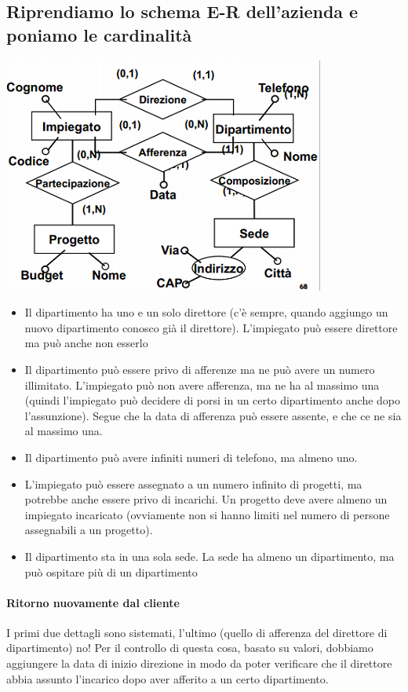 \subsection{Riprendiamo lo schema E-R dell'azienda e poniamo le cardinalità}
\begin{center}\includegraphics{images/18.PNG}\end{center}
\begin{itemize}
	\item Il dipartimento ha uno e un solo direttore (c'è sempre, quando aggiungo un nuovo dipartimento conosco già il direttore). L'impiegato può essere direttore ma può anche non esserlo
	\item Il dipartimento può essere privo di afferenze ma ne può avere un numero illimitato. L'impiegato può non avere afferenza, ma ne ha al massimo una (quindi l'impiegato può decidere di porsi in un certo dipartimento anche dopo l'assunzione). Segue che la data di afferenza può essere assente, e che ce ne sia al massimo una.
	\item Il dipartimento può avere infiniti numeri di telefono, ma almeno uno.
	\item L'impiegato può essere assegnato a un numero infinito di progetti, ma potrebbe anche essere privo di incarichi. Un progetto deve avere almeno un impiegato incaricato (ovviamente non si hanno limiti nel numero di persone assegnabili a un progetto).
	\item Il dipartimento sta in una sola sede. La sede ha almeno un dipartimento, ma può ospitare più di un dipartimento
\end{itemize}
\paragraph{Ritorno nuovamente dal cliente} I primi due dettagli sono sistemati, l'ultimo (quello di afferenza del direttore di dipartimento) no! Per il controllo di questa cosa, basato su valori, dobbiamo aggiungere la data di inizio direzione in modo da poter verificare che il direttore abbia assunto l'incarico dopo aver afferito a un certo dipartimento.

